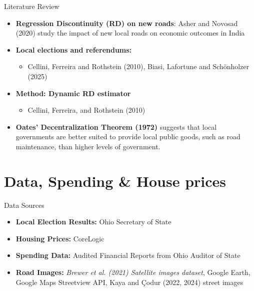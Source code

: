 \documentclass{beamer}
\begin{document}
\begin{frame}{Literature Review}
    \begin{itemize}
        \item \textbf{Regression Discontinuity (RD) on new roads}: Asher and Novosad (2020) study the impact of new local roads on economic outcomes in India 
        \item \textbf{Local elections and referendums:} 
        \begin{itemize}
            \item Cellini, Ferreira and Rothstein (2010), Biasi, Lafortune and Schönholzer (2025)
        \end{itemize}
        \item \textbf{Method: Dynamic RD estimator}
        \begin{itemize}
            \item Cellini, Ferreira, and Rothstein (2010)
        \end{itemize}
        \item {\bf Oates' Decentralization Theorem (1972)} suggests that local governments are better suited to provide local public goods, such as road maintenance, than higher levels of government.
    \end{itemize}
\end{frame}


\section{Data, Spending \& House prices}

\begin{frame}{Data Sources}
    \begin{itemize}
        \item \textbf{Local Election Results:} Ohio Secretary of State
        \vskip 0.5cm
        \item \textbf{Housing Prices:} CoreLogic
        \vskip 0.5cm
        \item \textbf{Spending Data:} Audited Financial Reports from Ohio Auditor of State 
        \vskip 0.5cm
        \item \textbf{Road Images:} \textit{Brewer et al. (2021) Satellite images dataset}, Google Earth, Google Maps Streetview API, Kaya and Çodur (2022, 2024) street images
    \end{itemize}
\end{frame}
\end{document}
